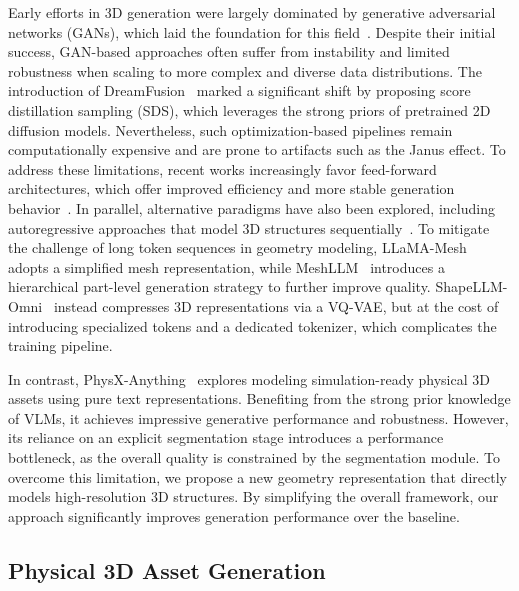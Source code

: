\documentclass[11pt]{article}
\begin{document}
Early efforts in 3D generation were largely dominated by generative adversarial networks (GANs), which laid the foundation for this field~\cite{chan2022efficient,gao2022get3d}. Despite their initial success, GAN-based approaches often suffer from instability and limited robustness when scaling to more complex and diverse data distributions. The introduction of DreamFusion~\cite{poole2022dreamfusion} marked a significant shift by proposing score distillation sampling (SDS), which leverages the strong priors of pretrained 2D diffusion models. Nevertheless, such optimization-based pipelines remain computationally expensive and are prone to artifacts such as the Janus effect. To address these limitations, recent works increasingly favor feed-forward architectures, which offer improved efficiency and more stable generation behavior~\cite{trellis,lgm,instantmesh,3dtopia,3dtopiaxl,difftf,difftf1,zlabor,yang2025holopart,yao2026anchoreddream,lin2025partcrafter,seed2025seed3d}. In parallel, alternative paradigms have also been explored, including autoregressive approaches that model 3D structures sequentially~\cite{chen2024meshanything,siddiqui2024meshgpt}. To mitigate the challenge of long token sequences in geometry modeling, LLaMA-Mesh~\cite{wang2024llama} adopts a simplified mesh representation, while MeshLLM~\cite{fang2025meshllm} introduces a hierarchical part-level generation strategy to further improve quality. ShapeLLM-Omni~\cite{ye2025shapellm} instead compresses 3D representations via a VQ-VAE, but at the cost of introducing specialized tokens and a dedicated tokenizer, which complicates the training pipeline.

In contrast, PhysX-Anything~\cite{cao2025physxanything} explores modeling simulation-ready physical 3D assets using pure text representations. Benefiting from the strong prior knowledge of VLMs, it achieves impressive generative performance and robustness. However, its reliance on an explicit segmentation stage introduces a performance bottleneck, as the overall quality is constrained by the segmentation module. To overcome this limitation, we propose a new geometry representation that directly models high-resolution 3D structures. By simplifying the overall framework, our approach significantly improves generation performance over the baseline.











\subsection{Physical 3D Asset Generation}
\end{document}
